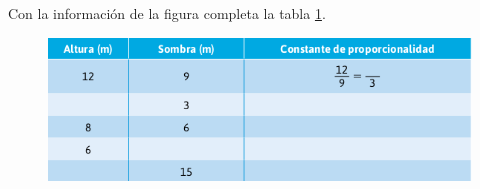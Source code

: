 Con la información de la figura completa la tabla \ref{tab:tabla_sombras}.

\begin{figure}[H]
    \centering
    \includegraphics[width=0.85\linewidth]{../images/tabla_sombras.png}
    \label{tab:tabla_sombras}
\end{figure}
